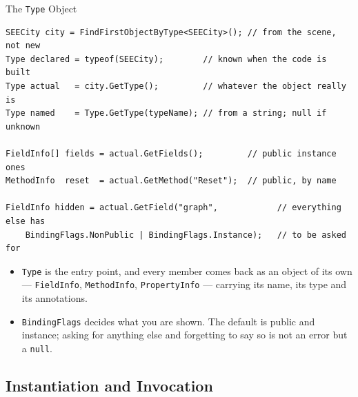 \begin{frame}[fragile]{The \texttt{Type} Object}
  \begin{lstlisting}[basicstyle=\scriptsize\ttfamily]
SEECity city = FindFirstObjectByType<SEECity>(); // from the scene, not new
Type declared = typeof(SEECity);        // known when the code is built
Type actual   = city.GetType();         // whatever the object really is
Type named    = Type.GetType(typeName); // from a string; null if unknown

FieldInfo[] fields = actual.GetFields();         // public instance ones
MethodInfo  reset  = actual.GetMethod("Reset");  // public, by name

FieldInfo hidden = actual.GetField("graph",            // everything else has
    BindingFlags.NonPublic | BindingFlags.Instance);   // to be asked for
  \end{lstlisting}
  \vspace{1ex}

  \begin{itemize}
    \item \texttt{Type} is the entry point, and every member comes back as an
      object of its own --- \texttt{FieldInfo}, \texttt{MethodInfo},
      \texttt{PropertyInfo} --- carrying its name, its type and its
      annotations.
    \item \texttt{BindingFlags} decides what you are shown. The default is
      public and instance; asking for anything else and forgetting to say so
      is not an error but a \texttt{null}.
  \end{itemize}
\end{frame}

\subsection{Instantiation and Invocation}

